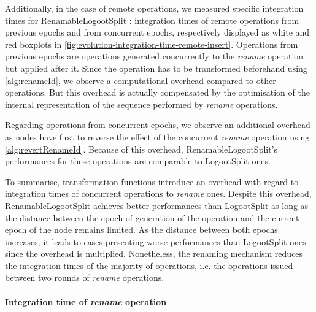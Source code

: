 \documentclass[10pt,journal,compsoc]{IEEEtran}
\newcommand{\ie}{i.e. }
\begin{document}
Additionally, in the case of remote operations, we measured specific integration times for RenamableLogootSplit : integration times of remote operations from previous epochs and from concurrent epochs, respectively displayed as white and red boxplots in \autoref{fig:evolution-integration-time-remote-insert}.
Operations from previous epochs are operations generated concurrently to the \emph{rename} operation but applied after it.
Since the operation has to be transformed beforehand using \autoref{alg:renameId}, we observe a computational overhead compared to other operations.
But this overhead is actually compensated by the optimisation of the internal representation of the sequence performed by \emph{rename} operations.

Regarding operations from concurrent epochs, we observe an additional overhead as nodes have first to reverse the effect of the concurrent \emph{rename} operation using \autoref{alg:revertRenameId}.
Because of this overhead, RenamableLogootSplit's performances for these operations are comparable to LogootSplit ones.

To summarise, transformation functions introduce an overhead with regard to integration times of concurrent operations to \emph{rename} ones.
Despite this overhead, RenamableLogootSplit achieves better performances than LogootSplit as long as the distance between the epoch of generation of the operation and the current epoch of the node remains limited.
As the distance between both epochs increases, it leads to cases presenting worse performances than LogootSplit ones since the overhead is multiplied.
Nonetheless, the renaming mechanism reduces the integration times of the majority of operations, \ie the operations issued between two rounds of \emph{rename} operations.

\paragraph{Integration time of \emph{rename} operation}
\end{document}
